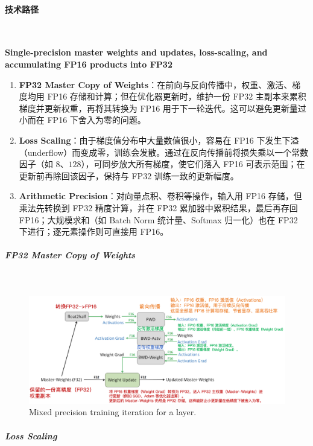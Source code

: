 \paragraph{技术路径}~{}

\textbf{{\color{tred}Single-precision master weights and updates, loss-scaling, and accumulating FP16 products into FP32}}


\begin{enumerate}
    \item \textbf{FP32 Master Copy of Weights}：在前向与反向传播中，权重、激活、梯度均用 FP16 存储和计算；但在优化器更新时，维护一份 FP32 主副本来累积梯度并更新权重，再将其转换为 FP16 用于下一轮迭代。这可以避免更新量过小而在 FP16 下舍入为零的问题。

    \item \textbf{Loss Scaling}：由于梯度值分布中大量数值很小，容易在 FP16 下发生下溢（underflow）而变成零，训练会发散。通过在反向传播前将损失乘以一个常数因子（如 $8$、$128$），可同步放大所有梯度，使它们落入 FP16 可表示范围；在更新前再除回该因子，保持与 FP32 训练一致的更新幅度。
    
    \item \textbf{Arithmetic Precision}：对向量点积、卷积等操作，输入用 FP16 存储，但乘法先转换到 FP32 精度计算，并在 FP32 累加器中累积结果，最后再存回 FP16；大规模求和（如 Batch Norm 统计量、Softmax 归一化）也在 FP32 下进行；逐元素操作则可直接用 FP16。
\end{enumerate}


\subparagraph{FP32 Master Copy of Weights}~{}

\begin{figure}[htbp]
  \centering
  \includegraphics[width=1.1\linewidth]{figs/lec2/lec2.36.png}
  \caption{Mixed precision training iteration for a layer.}
  \label{Mixed precision training iteration for a layer.}
\end{figure}

\subparagraph{Loss Scaling}~{}



